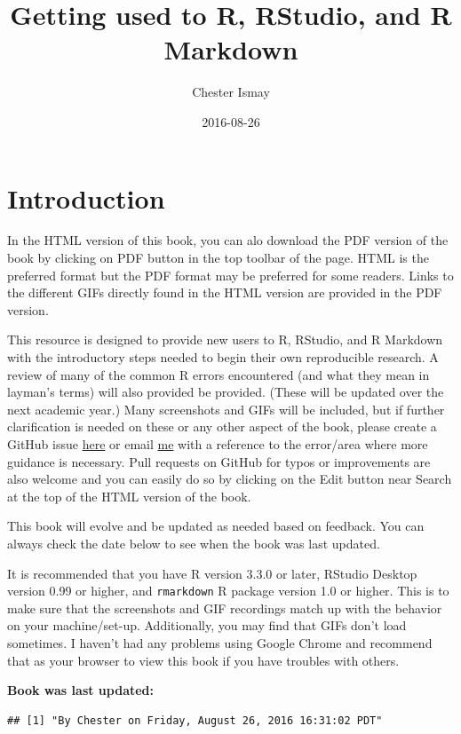 \documentclass[]{tufte-book}
\title{Getting used to R, RStudio, and R Markdown}
\author{Chester Ismay}
\date{2016-08-26}
\begin{document}
\maketitle



{
\setcounter{tocdepth}{1}
\tableofcontents
}

\chapter{Introduction}\label{intro}

In the HTML version of this book, you can alo download the PDF version
of the book by clicking on PDF button in the top toolbar of the page.
HTML is the preferred format but the PDF format may be preferred for
some readers. Links to the different GIFs directly found in the HTML
version are provided in the PDF version.

This resource is designed to provide new users to R, RStudio, and R
Markdown with the introductory steps needed to begin their own
reproducible research. A review of many of the common R errors
encountered (and what they mean in layman's terms) will also provided be
provided. (These will be updated over the next academic year.) Many
screenshots and GIFs will be included, but if further clarification is
needed on these or any other aspect of the book, please create a GitHub
issue \href{https://github.com/ismayc/rbasics/issues}{here} or email
\href{mailto:chester.ismay@gmail.com}{me} with a reference to the
error/area where more guidance is necessary. Pull requests on GitHub for
typos or improvements are also welcome and you can easily do so by
clicking on the Edit button near Search at the top of the HTML version
of the book.

This book will evolve and be updated as needed based on feedback. You
can always check the date below to see when the book was last updated.

It is recommended that you have R version 3.3.0 or later, RStudio
Desktop version 0.99 or higher, and \texttt{rmarkdown} R package version
1.0 or higher. This is to make sure that the screenshots and GIF
recordings match up with the behavior on your machine/set-up.
Additionally, you may find that GIFs don't load sometimes. I haven't had
any problems using Google Chrome and recommend that as your browser to
view this book if you have troubles with others.

\textbf{Book was last updated:}

\begin{verbatim}
## [1] "By Chester on Friday, August 26, 2016 16:31:02 PDT"
\end{verbatim}
\end{document}
